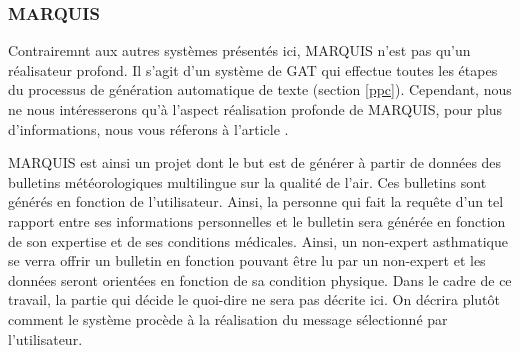 \subsubsection{MARQUIS}
Contrairemnt aux autres systèmes présentés ici, MARQUIS n'est pas qu'un réalisateur profond. Il s'agit d'un système de \ac{GAT} qui effectue toutes les étapes du processus de génération automatique de texte (section \ref{ppc}). Cependant, nous ne nous intéresserons qu'à l'aspect réalisation profonde de MARQUIS, pour plus d'informations, nous vous réferons à l'article \citep{WannerMARQUISGENERATIONUSERTAILORED2010}. 

MARQUIS est ainsi un projet dont le but est de générer à partir de données des bulletins météorologiques multilingue sur la qualité de l'air. Ces bulletins sont générés en fonction de l'utilisateur. Ainsi, la personne qui fait la requête d'un tel rapport entre ses informations personnelles et le bulletin sera générée en fonction de son expertise et de ses conditions médicales. Ainsi, un non-expert asthmatique se verra offrir un bulletin en fonction pouvant être lu par un non-expert et les données seront orientées en fonction de sa condition physique. Dans le cadre de ce travail, la partie qui décide le quoi-dire ne sera pas décrite ici. On décrira plutôt comment le système procède à la réalisation du message sélectionné par l'utilisateur.


